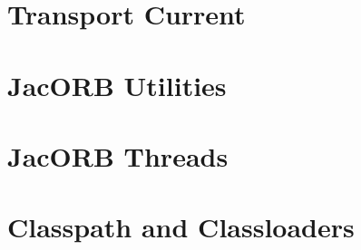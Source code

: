 \documentclass[12pt]{scrbook}
\begin{document}

\chapter{Transport Current}
\label{ch:transportcurrent}






\chapter{JacORB Utilities}
\label{ch:tools}





\chapter{JacORB Threads}
\label{ch:threads}






\chapter{Classpath and Classloaders}
\label{ch:classloader}





{


}
\end{document}
